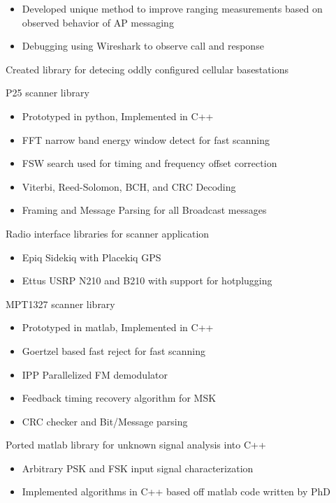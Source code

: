 \begin{cventries}
{\begin{cvitems}
\begin{itemize}
          \item {Developed unique method to improve ranging measurements based on observed behavior of AP messaging}
          \item {Debugging using Wireshark to observe call and response}
        \end{itemize}
        \item {Created library for detecing oddly configured cellular basestations}
        \item {P25 scanner library}
        \begin{itemize}
          \item {Prototyped in python, Implemented in C++}
          \item {FFT narrow band energy window detect for fast scanning}
          \item {FSW search used for timing and frequency offset correction}
          \item {Viterbi, Reed-Solomon, BCH, and CRC Decoding}
          \item {Framing and Message Parsing for all Broadcast messages}
        \end{itemize}
        \item {Radio interface libraries for scanner application}
        \begin{itemize}
          \item {Epiq Sidekiq with Placekiq GPS}
          \item {Ettus USRP N210 and B210 with support for hotplugging}
        \end{itemize}
        \item {MPT1327 scanner library}
        \begin{itemize}
          \item {Prototyped in matlab, Implemented in C++}
          \item {Goertzel based fast reject for fast scanning}
          \item {IPP Parallelized FM demodulator}
          \item {Feedback timing recovery algorithm for MSK}
          \item {CRC checker and Bit/Message parsing}
        \end{itemize}
        \item {Ported matlab library for unknown signal analysis into C++}
        \begin{itemize}
          \item {Arbitrary PSK and FSK input signal characterization}
          \item {Implemented algorithms in C++ based off matlab code written by PhD}
        \end{itemize}
      \end{cvitems}
    }


\end{cventries}
